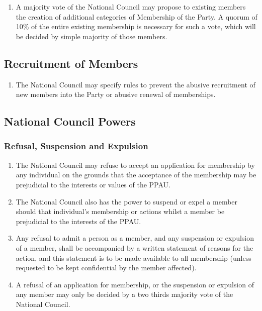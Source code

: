 \documentclass[a4paper,titlepage,8.5pt]{article}
\begin{document}
\begin{enumerate}
\item A majority vote of the National Council may propose to existing members the creation of additional categories of Membership of the Party. A quorum of 10\% of the entire existing membership is necessary for such a vote, which will be decided by simple majority of those members. 
\end{enumerate}

\subsection{Recruitment of Members}

\begin{enumerate}
\item The National Council may specify rules to prevent the abusive recruitment of new members into the Party or abusive renewal of memberships. 
\end{enumerate}

\subsection{National Council Powers}

\subsubsection{Refusal, Suspension and Expulsion}

\begin{enumerate}
\item The National Council may refuse to accept an application for membership by any individual on the grounds that the acceptance of the membership may be prejudicial to the interests or values of the PPAU.
\item The National Council also has the power to suspend or expel a member should that individual’s membership or actions whilst a member be prejudicial to the interests of the PPAU.
\item Any refusal to admit a person as a member, and any suspension or expulsion of a member, shall be accompanied by a written statement of reasons for the action, and this statement is to be made available to all membership (unless requested to be kept confidential by the member affected).
\item A refusal of an application for membership, or the suspension or expulsion of any member may only be decided by a two thirds majority vote of the National Council.
\end{enumerate}
\end{document}
